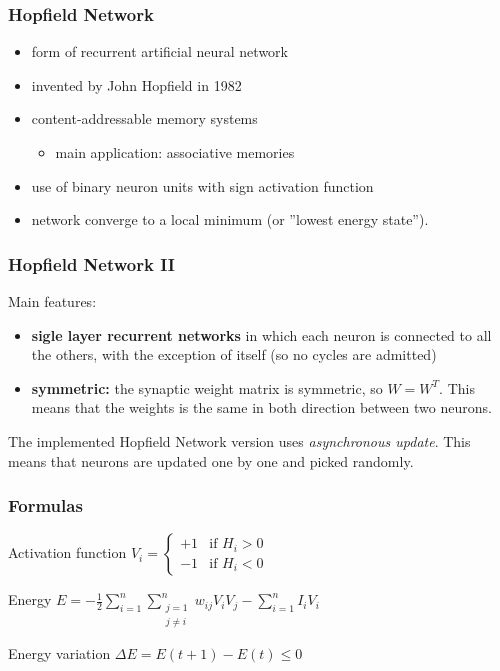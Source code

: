 \documentclass{beamer}
\begin{document}
\begin{frame}
\frametitle{Hopfield Network}
\begin{itemize}
\item form of recurrent artificial neural network
\item invented by John Hopfield in 1982
\item content-addressable memory systems
\begin{itemize}
\item main application: associative memories
\end{itemize}
\item use of binary neuron units with sign activation function
\item network converge to a local minimum (or ”lowest energy state”).
\end{itemize}
\end{frame}


\begin{frame}
\frametitle{Hopfield Network II}
Main features:
\begin{itemize}
\item\textbf{sigle layer recurrent networks} in which each neuron is connected to all the others, with the exception of itself (so no cycles are admitted)
\item\textbf{symmetric:} the synaptic weight matrix is symmetric, so $W=W^T$. This means that the weights is the same in both direction between two neurons.
\end{itemize}
The implemented Hopfield Network version uses \emph{asynchronous update}. This means that neurons are updated one by one and picked randomly.
\end{frame}



\begin{frame}
\frametitle{Formulas}
\begin{block}{Activation function}
$V_i = \begin{cases}
		+1 & \text{if } H_i > 0 \\
		-1 & \text{if } H_i < 0
	\end{cases}$
\end{block}

\begin{block}{Energy}
$E = - \frac{1}{2} \sum_{i=1}^n \sum_{\substack{j=1 \\ j \neq i}}^n w_{ij} V_i V_j - \sum_{i=1}^n I_i V_i$
\end{block}
\begin{block}{Energy variation}
$\Delta E = E(t+1)-E(t)\leq 0$
\end{block}
\end{frame}
\end{document}
